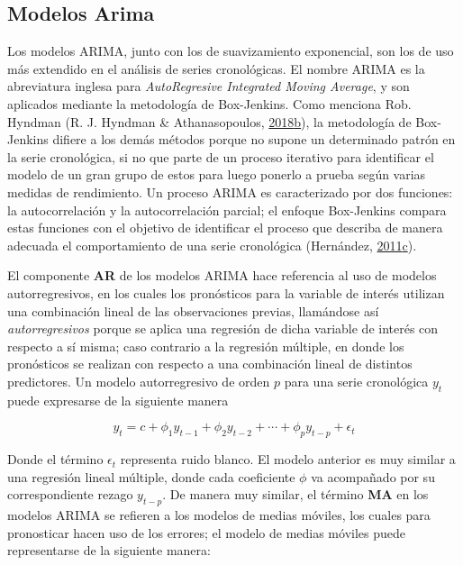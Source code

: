 \documentclass[]{article}
\begin{document}
\subsection{Modelos Arima}

Los modelos ARIMA, junto con los de suavizamiento exponencial, son los
de uso más extendido en el análisis de series cronológicas. El nombre
ARIMA es la abreviatura inglesa para \emph{AutoRegresive Integrated
Moving Average}, y son aplicados mediante la metodología de Box-Jenkins.
Como menciona Rob. Hyndman (R. J. Hyndman \& Athanasopoulos,
\protect\hyperlink{ref-hyndman_box-jenkins}{2018}\protect\hyperlink{ref-hyndman_box-jenkins}{b}),
la metodología de Box-Jenkins difiere a los demás métodos porque no
supone un determinado patrón en la serie cronológica, si no que parte de
un proceso iterativo para identificar el modelo de un gran grupo de
estos para luego ponerlo a prueba según varias medidas de rendimiento.
Un proceso ARIMA es caracterizado por dos funciones: la autocorrelación
y la autocorrelación parcial; el enfoque Box-Jenkins compara estas
funciones con el objetivo de identificar el proceso que describa de
manera adecuada el comportamiento de una serie cronológica (Hernández,
\protect\hyperlink{ref-oscarh-3}{2011}\protect\hyperlink{ref-oscarh-3}{c}).

El componente \textbf{AR} de los modelos ARIMA hace referencia al uso de
modelos autorregresivos, en los cuales los pronósticos para la variable
de interés utilizan una combinación lineal de las observaciones previas,
llamándose así \emph{autorregresivos} porque se aplica una regresión de
dicha variable de interés con respecto a sí misma; caso contrario a la
regresión múltiple, en donde los pronósticos se realizan con respecto a
una combinación lineal de distintos predictores. Un modelo
autorregresivo de orden \(p\) para una serie cronológica \(y_t\) puede
expresarse de la siguiente manera

\begin{equation}
y_t=c+\phi_1y_{t-1}+\phi_2y_{t-2}+\cdots+\phi_py_{t-p}+\epsilon_t
\end{equation}

Donde el término \(\epsilon_t\) representa ruido blanco. El modelo
anterior es muy similar a una regresión lineal múltiple, donde cada
coeficiente \(\phi\) va acompañado por su correspondiente rezago
\(y_{t-p}\). De manera muy similar, el término \textbf{MA} en los
modelos ARIMA se refieren a los modelos de medias móviles, los cuales
para pronosticar hacen uso de los errores; el modelo de medias móviles
puede representarse de la siguiente manera:
\end{document}
